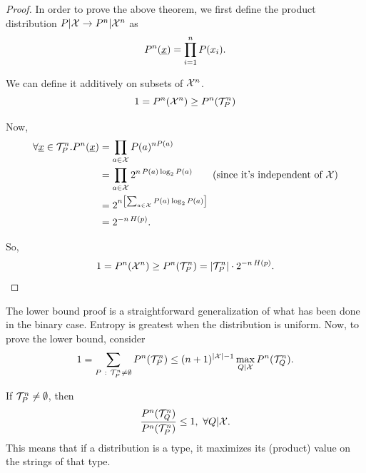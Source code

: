 \begin{proof}
	In order to prove the above theorem, we first define the product distribution $P|\mathcal{X} \to P^n|\mathcal{X}^n$ as 
	\begin{equation*}
		P^n(\underline{x}) = \prod_{i = 1}^nP(x_i).
	\end{equation*}

	We can define it additively on subsets of $\mathcal{X}^n$.
	\begin{equation*}
		1 = P^n(\mathcal{X}^n) \ge P^n(\mathcal{T}_P^n)
	\end{equation*}

	Now,
	\begin{align*}
		\forall \str{x} \in \T_P^n . P^n(\str{x})
		& =
		\prod_{a \in \X} P(a)^{n P(a)}
		\\
		& =
		\prod_{a \in \X} 2^{n \, P(a)\log_2 P(a)} \tag{since it's independent of $\X$}
		\\
		& =
		2^{n \left[\sum_{a \in \X} P(a) \log_2 P(a) \right]}
		\\
		& =
		2^{-n \, \Entropy{p}}.
	\end{align*}

	So,
	\begin{equation*}
		1 = P^n(\mathcal{X}^n) \ge P^n(\mathcal{T}_P^n) = \left|{\mathcal{T}_P^n}\right| \cdot 2^{-n \, H\left({p}\right)}. \qedhere
	\end{equation*}
\end{proof}

The lower bound proof is a straightforward generalization of what has been done in the binary case.
Entropy is greatest when the distribution is uniform.
Now, to prove the lower bound, consider
\begin{equation*}
	1 =
	\sum_{P\ :\ \mathcal{T}_P^n \neq \emptyset} P^n(\mathcal{T}_P^n) \le
	(n+1)^{\left|{\mathcal{X}}\right|-1} \max_{Q|\mathcal{X}} P^n(\mathcal{T}_Q^n).
\end{equation*}

\begin{obs}
	If $\mathcal{T}_P^n \neq \emptyset$, then 
	\begin{equation*}
		\frac{P^n(\T_Q^n)}{P^n(\T_P^n)} \le 1,\ \forall Q|\xset.
	\end{equation*}
	This means that if a distribution is a type, it maximizes its (product) value on the strings of that type. 
\end{obs}

